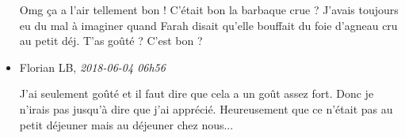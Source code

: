 \begin{itemize}
  Omg ça a l'air tellement bon ! C'était bon la barbaque crue ? J'avais
  toujours eu du mal à imaginer quand Farah disait qu'elle bouffait du
  foie d'agneau cru au petit déj. T'as goûté ? C'est bon ?
\item
  Florian LB, \emph{2018-06-04 06h56}

  J'ai seulement goûté et il faut dire que cela a un goût assez fort.
  Donc je n'irais pas jusqu'à dire que j'ai apprécié. Heureusement que
  ce n'était pas au petit déjeuner mais au déjeuner chez nous...
\end{itemize}
